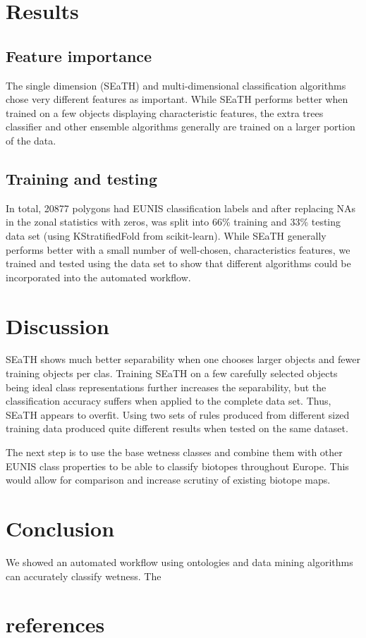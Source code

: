 \documentclass[authoryear, review,12pt,number]{elsarticle}
\begin{document}
\section{Results}

\subsection{Feature importance}
The single dimension (SEaTH) and multi-dimensional classification
algorithms chose very different features as important. While SEaTH performs
better when trained on a few objects displaying characteristic
features\citep{Nussbaum2006}, the extra trees classifier and other ensemble
algorithms generally are trained on a larger portion of the data. 

\subsection{Training and testing}
In total, 20877 polygons had EUNIS classification labels and after replacing NAs
in the zonal statistics with zeros, was split into 66\% training and 33\%
testing data set (using KStratifiedFold from scikit-learn). While SEaTH
generally performs better with a small number of well-chosen, characteristics
features, we trained and tested using the data set to show that different
algorithms could be incorporated into the automated workflow. 
\section{Discussion}
SEaTH shows much better separability when one chooses larger objects and fewer
training objects per clas. Training SEaTH on a few carefully selected objects
being ideal class representations further increases the separability, but the classification
accuracy suffers when applied to the complete data set. Thus, SEaTH appears to
overfit. Using two sets of rules produced from different sized training data
produced quite different results when tested on the same dataset.

The next step is to use the base wetness classes and combine them with other
EUNIS class properties to be able to classify biotopes throughout Europe. This
would allow for comparison and increase scrutiny of existing biotope maps.

\section{Conclusion}
We showed an automated workflow using ontologies and data mining algorithms can
accurately classify wetness. The

\section{references}

\end{document}
